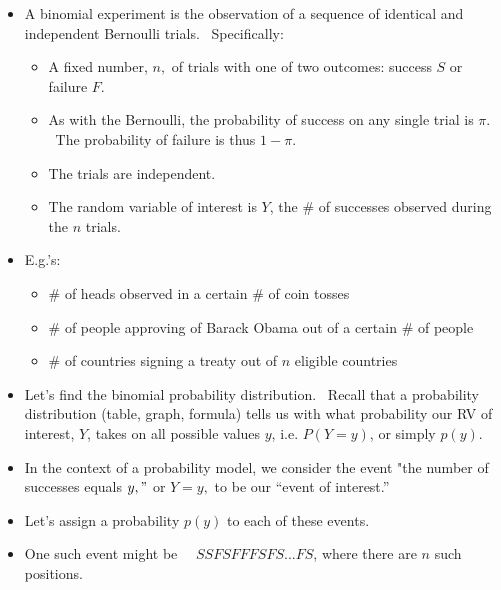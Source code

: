 \documentclass[11pt]{article}
\begin{document}
\begin{itemize}
\item A binomial experiment is the observation of a sequence of identical
and independent Bernoulli trials. \ Specifically:

\begin{itemize}
\item A fixed number, $n,$ of trials with one of two outcomes: success $S$
or failure $F$.

\item As with the Bernoulli, the probability of success on any single trial
is $\pi $. \ The probability of failure is thus $1-\pi .$

\item The trials are independent.

\item The random variable of interest is $Y$, the \# of successes observed
during the $n$ trials.
\end{itemize}

\item E.g.'s:

\begin{itemize}
\item \# of heads observed in a certain \# of coin tosses

\item \# of people approving of Barack Obama out of a certain \# of people

\item \# of countries signing a treaty out of $n$ eligible countries
\end{itemize}

\item Let's find the binomial probability distribution. \ Recall that a
probability distribution (table, graph, formula) tells us with what
probability our RV of interest, $Y$, takes on all possible values $y$, i.e. $%
P(Y=y)$, or simply $p(y).$

\item In the context of a probability model, we consider the event "the
number of successes equals $y,"$ or $Y=y,$ to be our \textquotedblleft event
of interest.\textquotedblright\ 

\item Let's assign a probability $p(y)$ to each of these events.

\item One such event might be \ \ $SSFSFFFSFS...FS$, where there are $n$
such positions.


\end{itemize}
\end{document}
